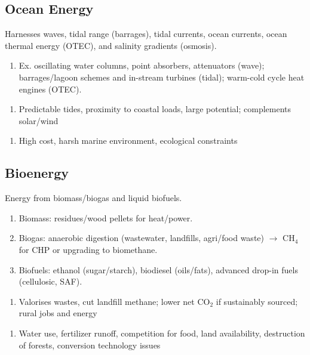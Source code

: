 \documentclass[12pt, a4paper]{article}
\begin{document}
\begin{multicols*}{3}
\colbreak
\subsection{Ocean Energy}
Harnesses waves, tidal range (barrages), tidal currents, ocean currents, ocean thermal energy (OTEC), and salinity gradients (osmosis).
\begin{enumerate}[\roman*.]
  \item Ex. oscillating water columns, point absorbers, attenuators (wave); barrages/lagoon schemes and in-stream turbines (tidal); warm-cold cycle heat engines (OTEC).
\end{enumerate}\vspace{-1pt}
\begin{enumerate}[$+$]
  \item Predictable tides, proximity to coastal loads, large potential; complements solar/wind
\end{enumerate}\vspace{-1pt}
\begin{enumerate}[$-$]
  \item High cost, harsh marine environment, ecological constraints
\end{enumerate}

\subsection{Bioenergy}
Energy from biomass/biogas and liquid biofuels.
\begin{enumerate}[\roman*.]
  \item Biomass: residues/wood pellets for heat/power.
  \item Biogas: anaerobic digestion (wastewater, landfills, agri/food waste) $\rightarrow$ CH$_4$ for CHP or upgrading to biomethane.
  \item Biofuels: ethanol (sugar/starch), biodiesel (oils/fats), advanced drop-in fuels (cellulosic, SAF).
\end{enumerate}\vspace{-1pt}
\begin{enumerate}[$+$]
  \item Valorises wastes, cut landfill methane; lower net CO$_2$ if sustainably sourced; rural jobs and energy
\end{enumerate}\vspace{-1pt}
\begin{enumerate}[$-$]
  \item Water use, fertilizer runoff, competition for food, land availability, destruction of forests, conversion technology issues 
\end{enumerate}


\end{multicols*}
\end{document}
